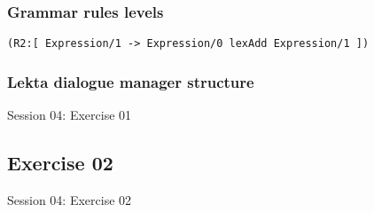 \documentclass[11pt]{beamer}
\begin{document}
\begin{frame}[noframenumbering]
\frametitle{Grammar rules levels}
\small
\begin{center}
\texttt{(R2:[ Expression/1 -> Expression/0 lexAdd Expression/1 ])}
\end{center}
\begin{center}
	\large
\end{center}
\end{frame}

\begin{frame}[fragile]
\frametitle{Lekta dialogue manager structure}
\end{frame}





\begin{frame}[fragile]
\Huge
\begin{center}
Session 04: Exercise 01
\end{center}
\end{frame}

\subsection{Exercise 02}

\begin{frame}[fragile]
\Huge
\begin{center}
Session 04: Exercise 02
\end{center}
\end{frame}
\end{document}
